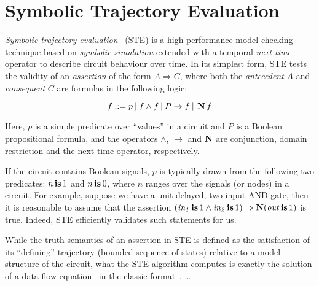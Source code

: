 \section{Symbolic Trajectory Evaluation}

\textit{Symbolic trajectory evaluation}~\cite{seger1995} (STE) is a high-performance model checking technique based on \textit{symbolic simulation} extended with a temporal \textit{next-time} operator to describe circuit behaviour over time. In its simplest form, STE tests the validity of an \textit{assertion} of the form $A \Rightarrow C$, where both the \textit{antecedent} $A$ and \textit{consequent} $C$ are formulas in the following logic:

\begin{equation*}
f ::= p \: | \: f \wedge f \: | \: P \rightarrow f \: | \: \operatorname{\textbf{N}} f
\end{equation*}

\noindent Here, $p$ is a simple predicate over ``values'' in a circuit and $P$ is a Boolean propositional formula, and the operators $\wedge$, $\rightarrow$ and $\operatorname{\textbf{N}}$ are conjunction, domain restriction and the next-time operator, respectively.

If the circuit contains Boolean signals, $p$ is typically drawn from the following two predicates: $n \operatorname{\mathbin{\textbf{is}}} 1$ and $n \operatorname{\mathbin{\textbf{is}}} 0$, where $n$ ranges over the signals (or nodes) in a circuit. For example, suppose we have a unit-delayed, two-input AND-gate, then it is reasonable to assume that the assertion $(\mathit{in_{1}} \operatorname{\mathbin{\textbf{is}}} 1 \wedge \mathit{in_{2}} \operatorname{\mathbin{\textbf{is}}} 1) \Rightarrow \operatorname{\textbf{N}} (\mathit{out} \operatorname{\mathbin{\textbf{is}}} 1)$ is true. Indeed, STE efficiently validates such statements for us.

While the truth semantics of an assertion in STE is defined as the satisfaction of its ``defining'' trajectory (bounded sequence of states) relative to a model structure of the circuit, what the STE algorithm computes is exactly the solution of a data-flow equation~\cite{chou1999} in the classic format~\cite{muchnick1997}. \dots


